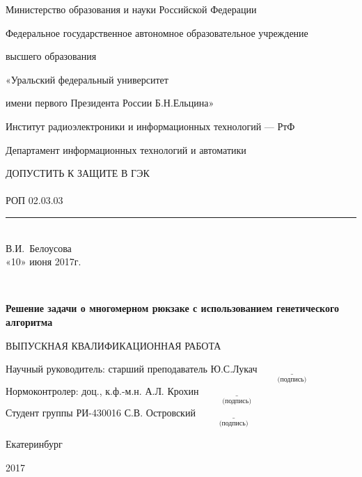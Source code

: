 \begin{titlepage}
{\small
\centerline{Министерство образования и науки Российской Федерации}
\centerline{Федеральное государственное автономное образовательное учреждение}
\centerline{высшего образования}
\centerline{\normalsize «Уральский федеральный университет}
\centerline{\normalsize имени первого Президента России Б.Н.Ельцина»}
\vskip0.2cm
\centerline{\normalsize Институт радиоэлектроники и информационных технологий --- РтФ}
\vskip0.2cm\centerline{\normalsize Департамент информационных технологий и автоматики}
}
\vskip1cm

\null\hfill
\begin{minipage}{0.6\textwidth}
\hfill ДОПУСТИТЬ К ЗАЩИТЕ В ГЭК \\ \\
РОП 02.03.03\rule[-1pt]{3.5cm}{0.4pt}
\\\phantom{XXXXXXXXXXXXXXXXXXX} В.И.~Белоусова
\\%
\hfill «10» июня  2017г.
\end{minipage}\\
\vskip2cm
\centerline{\bf Решение задачи о 
	многомерном рюкзаке с использованием генетического алгоритма}
\vskip0.2cm
\centerline{{ВЫПУСКНАЯ КВАЛИФИКАЦИОННАЯ РАБОТА}}

\vskip5.5cm
\noindent
Научный руководитель: старший преподаватель Ю.С.Лукач\hfill $\underset{\text{(подпись)}}{\underline{\hspace{3cm}}}$\\
\vskip0.2cm
Нормоконтролер: доц., к.ф.-м.н. А.Л. Крохин \hfill $\underset{\text{(подпись)}}{\underline{\hspace{3cm}}}$\\
\vskip0.2cm
Студент группы  РИ-430016 С.В. Островский  \hfill $\underset{\text{(подпись)}}{\underline{\hspace{3cm}}}$\\
\vfill
\centerline{Екатеринбург}
\centerline{2017}
\end{titlepage}